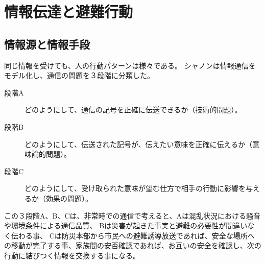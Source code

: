\documentclass[a4j]{jarticle}
\begin{document}

\section{情報伝達と避難行動}\label{sec:sns-communication}

\subsection{情報源と情報手段}
同じ情報を受けても、人の行動パターンは様々である。
シャノンは情報通信をモデル化し、通信の問題を３段階に分類した\cite{shanon}。
\begin{description}
\item[段階A] {どのようにして、通信の記号を正確に伝送できるか（技術的問題）。}
\item[段階B] {どのようにして、伝送された記号が、伝えたい意味を正確に伝えるか（意味論的問題）。}
\item[段階C] {どのようにして、受け取られた意味が望む仕方で相手の行動に影響を与えるか（効果の問題）。}
\end{description}

この３段階A、B、Cは、非常時での通信で考えると、Aは混乱状況における騒音や環境条件による通信品質、
Bは災害が起きた事実と避難の必要性が間違いなく伝わる事、
Cは防災本部から市民への避難誘導放送であれば、安全な場所への移動が完了する事、家族間の安否確認であれば、お互いの安全を確認し、次の行動に結びつく情報を交換する事になる。
\end{document}
